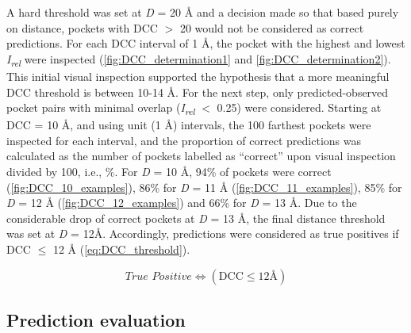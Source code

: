 A hard threshold was set at \textit{D} = 20 \AA{} and a decision made so that based purely on distance, pockets with DCC $>$ 20 would not be considered as correct predictions. For each DCC interval of 1 \AA{}, the pocket with the highest and lowest \textit{I\textsubscript{rel}} were inspected (\autoref{fig:DCC_determination1} and \autoref{fig:DCC_determination2}). This initial visual inspection supported the hypothesis that a more meaningful DCC threshold is between 10-14 \AA{}. For the next step, only predicted-observed pocket pairs with minimal overlap (\textit{I\textsubscript{rel}} $<$ 0.25) were considered. Starting at DCC = 10 \AA{}, and using unit (1 \AA{}) intervals, the 100 farthest pockets were inspected for each interval, and the proportion of correct predictions was calculated as the number of pockets labelled as ``correct'' upon visual inspection divided by 100, i.e., \%. For \textit{D} = 10 \AA{}, 94\% of pockets were correct (\autoref{fig:DCC_10_examples}), 86\% for \textit{D} = 11 \AA{} (\autoref{fig:DCC_11_examples}), 85\% for \textit{D} = 12 \AA{} (\autoref{fig:DCC_12_examples}) and 66\% for \textit{D} = 13 \AA{}. Due to the considerable drop of correct pockets at \textit{D} = 13 \AA{}, the final distance threshold was set at \textit{D} = 12\AA{}. Accordingly, predictions were considered as true positives if DCC $\leq$ 12 \AA{} (\autoref{eq:DCC_threshold}).

\begin{equation}
\textit{True Positive} \iff (\text{DCC} \leq 12\text{\AA{}})
\label{eq:DCC_threshold}
\end{equation}

\vspace{-12pt} %
\vspace{-12pt} %
\vspace{-12pt} %

\subsection{Prediction evaluation}

